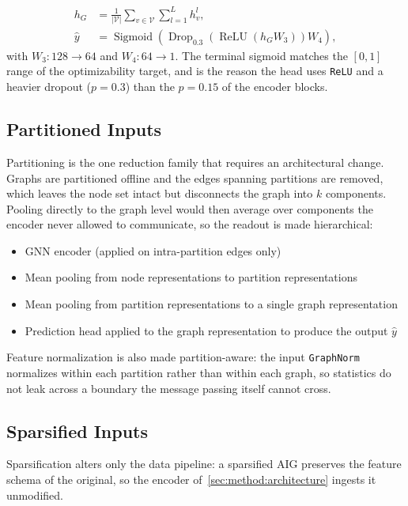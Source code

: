 \begin{align}
    h_G &= \frac{1}{|\mathcal{V}|} \sum_{v \in \mathcal{V}} \sum_{l=1}^{L} h_v^{l},
    \label{eq:method:pooling} \\
    \hat{y} &= \operatorname{Sigmoid}\!\left(
        \operatorname{Drop}_{0.3}\!\left( \operatorname{ReLU}(h_G W_3) \right) W_4 \right),
    \label{eq:method:readout}
\end{align}
with $W_3 \colon 128 \rightarrow 64$ and $W_4 \colon 64 \rightarrow 1$. The terminal
sigmoid matches the $[0, 1]$ range of the optimizability target, and is the reason the
head uses \texttt{ReLU} and a heavier dropout ($p = 0.3$) than the $p = 0.15$ of the
encoder blocks.

\subsection{Partitioned Inputs}
\label{sec:method:architecture:partitioning}
Partitioning is the one reduction family that requires an architectural change. Graphs are
partitioned offline and the edges spanning partitions are removed, which leaves the node
set intact but disconnects the graph into $k$ components. Pooling directly to the graph
level would then average over components the encoder never allowed to communicate, so the
readout is made hierarchical:

\begin{itemize}
  \item GNN encoder (applied on intra-partition edges only)
  \item Mean pooling from node representations to partition representations
  \item Mean pooling from partition representations to a single graph representation
  \item Prediction head applied to the graph representation to produce the output $\hat{y}$
\end{itemize}

Feature normalization is also made partition-aware: the input \texttt{GraphNorm} normalizes
within each partition rather than within each graph, so statistics do not leak across a
boundary the message passing itself cannot cross.

\subsection{Sparsified Inputs}
\label{sec:method:architecture:sparsification}
Sparsification alters only the data pipeline: a sparsified AIG preserves the feature
schema of the original, so the encoder of~\ref{sec:method:architecture} ingests it
unmodified.

